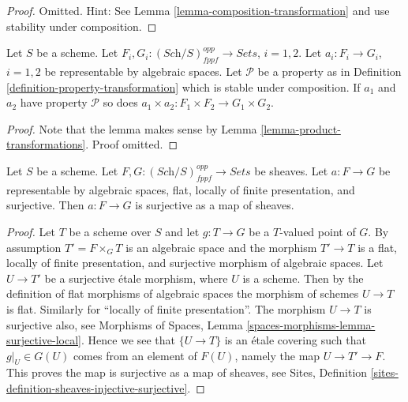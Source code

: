 \begin{proof}
Omitted. Hint: See
Lemma \ref{lemma-composition-transformation}
and use stability under composition.
\end{proof}

\begin{lemma}
\label{lemma-product-transformations-property}
Let $S$ be a scheme.
Let $F_i, G_i : (\textit{Sch}/S)_{fppf}^{opp} \to \textit{Sets}$,
$i = 1, 2$.
Let $a_i : F_i \to G_i$, $i = 1, 2$ be representable by algebraic spaces.
Let $\mathcal{P}$ be a property as in
Definition \ref{definition-property-transformation}
which is stable under composition.
If $a_1$ and $a_2$ have property $\mathcal{P}$ so does
$a_1 \times a_2 : F_1 \times F_2 \longrightarrow G_1 \times G_2$.
\end{lemma}

\begin{proof}
Note that the lemma makes sense by
Lemma \ref{lemma-product-transformations}.
Proof omitted.
\end{proof}

\begin{lemma}
\label{lemma-surective-flat-locally-finite-presentation-surjective-as-sheaves}
Let $S$ be a scheme.
Let $F, G : (\textit{Sch}/S)_{fppf}^{opp} \to \textit{Sets}$ be sheaves.
Let $a : F \to G$ be representable by algebraic spaces, flat,
locally of finite presentation, and surjective.
Then $a : F \to G$ is surjective as a map of sheaves.
\end{lemma}

\begin{proof}
Let $T$ be a scheme over $S$ and let $g : T \to G$ be a $T$-valued point of
$G$. By assumption $T' = F \times_G T$ is an algebraic space and
the morphism $T' \to T$ is a flat, locally of finite presentation, and
surjective morphism of algebraic spaces.
Let $U \to T'$ be a surjective \'etale morphism, where $U$ is a scheme.
Then by the definition of flat morphisms of algebraic spaces
the morphism of schemes $U \to T$ is flat. Similarly for
``locally of finite presentation''. The morphism $U \to T$ is surjective
also, see
Morphisms of Spaces, Lemma \ref{spaces-morphisms-lemma-surjective-local}.
Hence we see that $\{U \to T\}$ is an \'etale covering such
that $g|_U \in G(U)$ comes from an element of $F(U)$, namely
the map $U \to T' \to F$. This proves the map is surjective as
a map of sheaves, see
Sites, Definition \ref{sites-definition-sheaves-injective-surjective}.
\end{proof}




